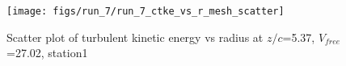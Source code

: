 \begin{figure}[H]
\centering
\texttt{[image: figs/run\_7/run\_7\_ctke\_vs\_r\_mesh\_scatter]}
\caption{Scatter plot of turbulent kinetic energy vs radius at $z/c$=5.37, $V_{free}$=27.02, station1}
\label{fig:run_7_ctke_vs_r_mesh_scatter}
\end{figure}


